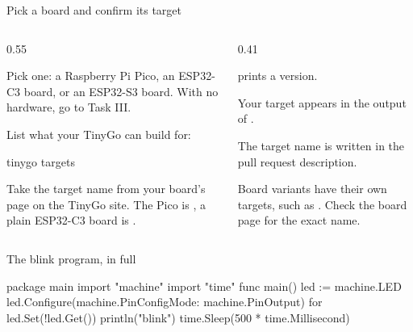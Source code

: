 \documentclass[10pt,aspectratio=169,t]{beamer}
\begin{document}
\begin{frame}[fragile,embedded,eyebrow=Task I]{Pick a board and confirm its target}
  \begin{columns}[T]
    \begin{column}{0.55\textwidth}
      \begin{steps}
        \item Pick one: a Raspberry Pi Pico, an ESP32-C3 board, or an ESP32-S3 board. With no hardware, go to Task III.
        \item List what your TinyGo can build for:
\begin{shell}
tinygo targets
\end{shell}
        \item Take the target name from your board's page on the TinyGo site. The Pico is , a plain ESP32-C3 board is .
      \end{steps}
    \end{column}
    \begin{column}{0.41\textwidth}
      \begin{checklist}
        \item {} prints a version.
        \item Your target appears in the output of .
        \item The target name is written in the pull request description.
      \end{checklist}
      \begin{warning}
        Board variants have their own targets, such as . Check the board page for the exact name.
      \end{warning}
    \end{column}
  \end{columns}
\end{frame}

\begin{frame}[fragile,embedded,eyebrow=Reference]{The blink program, in full}
\begin{golang}
package main
import "machine"
import "time"
func main() {
    led := machine.LED
    led.Configure(machine.PinConfig{Mode: machine.PinOutput})
    for {
        led.Set(!led.Get())
        println("blink")
        time.Sleep(500 * time.Millisecond)
    }
}
\end{golang}
\end{frame}
\end{document}
